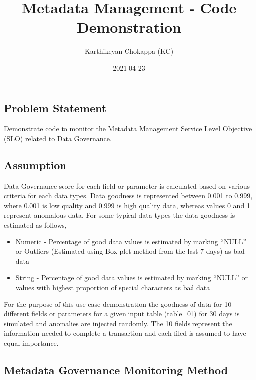 \documentclass[
]{article}
\title{Metadata Management - Code Demonstration}
\author{Karthikeyan Chokappa (KC)}
\date{2021-04-23}
\begin{document}
\maketitle

{
\setcounter{tocdepth}{2}
\tableofcontents
}
\hypertarget{problem-statement}{%
\subsection{Problem Statement}\label{problem-statement}}

Demonstrate code to monitor the Metadata Management Service Level
Objective (SLO) related to Data Governance.

\hypertarget{assumption}{%
\subsection{Assumption}\label{assumption}}

Data Governance score for each field or parameter is calculated based on
various criteria for each data types. Data goodness is represented
between 0.001 to 0.999, where 0.001 is low quality and 0.999 is high
quality data, whereas values 0 and 1 represent anomalous data. For some
typical data types the data goodness is estimated as follows,

\begin{itemize}
\item
  Numeric - Percentage of good data values is estimated by marking
  ``NULL'' or Outliers (Estimated using Box-plot method from the last 7
  days) as bad data
\item
  String - Percentage of good data values is estimated by marking
  ``NULL'' or values with highest proportion of special characters as
  bad data
\end{itemize}

For the purpose of this use case demonstration the goodness of data for
10 different fields or parameters for a given input table (table\_01)
for 30 days is simulated and anomalies are injected randomly. The 10
fields represent the information needed to complete a transaction and
each filed is assumed to have equal importance.

\hypertarget{metadata-governance-monitoring-method}{%
\subsection{Metadata Governance Monitoring
Method}\label{metadata-governance-monitoring-method}}
\end{document}
